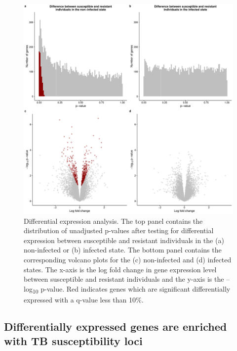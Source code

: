 \documentclass[fleqn,10pt]{wlscirep}
\begin{document}
\begin{figure}[p]
\centering
\includegraphics[width=\linewidth]{../figure/limma.pdf}
\caption{
Differential expression analysis. The top panel contains the
distribution of unadjusted p-values after testing for differential
expression between susceptible and resistant individuals in the (a)
non-infected or (b) infected state. The bottom panel contains the
corresponding volcano plots for the (c) non-infected and (d) infected
states. The x-axis is the log fold change in gene expression level
between susceptible and resistant individuals and the y-axis is the
–log\textsubscript{10} p-value. Red indicates genes which are
significant differentially expressed with a q-value less than 10\%.
}
\label{fig:limma}
\end{figure}
\subsection*{Differentially expressed genes are enriched with TB susceptibility loci}
\end{document}
